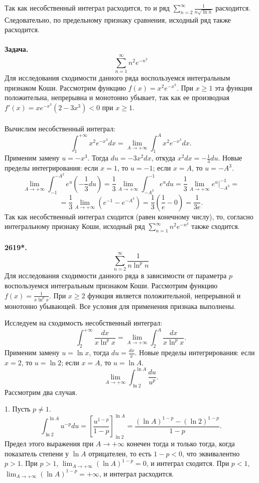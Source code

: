 \documentclass[a4paper, 12pt]{report}
\numberwithin{equation}{section}
\begin{document}
	Так как несобственный интеграл расходится, то и ряд $\sum_{n=2}^{\infty} \frac{1}{n\sqrt{\ln n}}$ расходится.
	Следовательно, по предельному признаку сравнения, исходный ряд также расходится.
	\\\\
	\textbf{Задача.}
	$$\sum_{n=1}^{\infty} n^2 e^{-n^3}$$
	Для исследования сходимости данного ряда воспользуемся интегральным признаком Коши.
	Рассмотрим функцию $f(x) = x^2 e^{-x^3}$. При $x \ge 1$ эта функция положительна, непрерывна и монотонно убывает, так как ее производная $f'(x) = xe^{-x^3}(2-3x^3) < 0$ при $x \ge 1$.
	\\\\
	Вычислим несобственный интеграл:
	$$ \int_{1}^{+\infty} x^2 e^{-x^3} dx = \lim_{A \to +\infty} \int_{1}^{A} x^2 e^{-x^3} dx. $$
	Применим замену $u = -x^3$. Тогда $du = -3x^2 dx$, откуда $x^2 dx = -\frac{1}{3}du$.
	Новые пределы интегрирования: если $x=1$, то $u = -1$; если $x = A$, то $u = -A^3$.
	$$ \lim_{A \to +\infty} \int_{-1}^{-A^3} e^u \left(-\frac{1}{3}du\right) = \frac{1}{3} \lim_{A \to +\infty} \int_{-A^3}^{-1} e^u du = \frac{1}{3} \lim_{A \to +\infty} e^u\Big|_{-A^3}^{-1}=$$
	$$ = \frac{1}{3} \lim_{A \to +\infty} (e^{-1} - e^{-A^3}) = \frac{1}{3} \left(\frac{1}{e} - 0\right) = \frac{1}{3e}. $$
	Так как несобственный интеграл сходится (равен конечному числу), то, согласно интегральному признаку Коши, исходный ряд $\sum_{n=1}^{\infty} n^2 e^{-n^3}$ также сходится.
	\\\\
	\textbf{2619*.}
	$$\sum_{n=2}^{\infty} \frac{1}{n \ln^p n}$$
	Для исследования сходимости данного ряда в зависимости от параметра $p$ воспользуемся интегральным признаком Коши.
	Рассмотрим функцию $f(x) = \frac{1}{x \ln^p x}$. При $x \ge 2$ функция является положительной, непрерывной и монотонно убывающей. Все условия для применения признака выполнены.
	
	Исследуем на сходимость несобственный интеграл:
	$$ \int_{2}^{+\infty} \frac{dx}{x \ln^p x} = \lim_{A \to +\infty} \int_{2}^{A} \frac{dx}{x \ln^p x}. $$
	Применим замену $u = \ln x$, тогда $du = \frac{dx}{x}$.
	Новые пределы интегрирования: если $x=2$, то $u=\ln 2$; если $x=A$, то $u=\ln A$.
	$$ \lim_{A \to +\infty} \int_{\ln 2}^{\ln A} \frac{du}{u^p}. $$
	Рассмотрим два случая.
	
	1. Пусть $p \neq 1$.
	$$ \int_{\ln 2}^{\ln A} u^{-p} du = \left[ \frac{u^{1-p}}{1-p} \right]_{\ln 2}^{\ln A} = \frac{(\ln A)^{1-p} - (\ln 2)^{1-p}}{1-p}. $$
	Предел этого выражения при $A \to +\infty$ конечен тогда и только тогда, когда показатель степени у $\ln A$ отрицателен, то есть $1-p < 0$, что эквивалентно $p > 1$.
	При $p > 1$, $\lim_{A \to +\infty} (\ln A)^{1-p} = 0$, и интеграл сходится.
	При $p < 1$, $\lim_{A \to +\infty} (\ln A)^{1-p} = +\infty$, и интеграл расходится.
	
\end{document}
